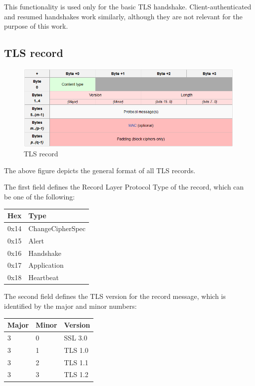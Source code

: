 This functionality is used only for the basic TLS handshake.
Client-authenticated and resumed handshakes work similarly, although they are not
relevant for the purpose of this work.

\subsection{TLS record}

\begin{figure}[H] \caption{TLS record} \centering
\includegraphics[width=1\textwidth]{diagrams/tls_record.png}\end{figure}

The above figure depicts the general format of all TLS records.

The first field defines the Record Layer Protocol Type of the record, which can
be one of the following:

\begin{table}[H] \centering \begin{tabular}{ | l | l | } \hline \textbf{Hex} &
\textbf{Type} \\ \hline 0x14 & ChangeCipherSpec \\ 0x15 & Alert \\ 0x16 &
Handshake \\ 0x17 & Application \\ 0x18 & Heartbeat \\ \hline \end{tabular}
\end{table}

The second field defines the TLS version for the record message, which is
identified by the major and minor numbers:

\begin{table}[H] \centering \begin{tabular}{ | l | l | l | } \hline
\textbf{Major} & \textbf{Minor} & \textbf{Version} \\ \hline 3 & 0 & SSL 3.0 \\
3 & 1 & TLS 1.0 \\ 3 & 2 & TLS 1.1 \\ 3 & 3 & TLS 1.2 \\ \hline \end{tabular}
\end{table}

